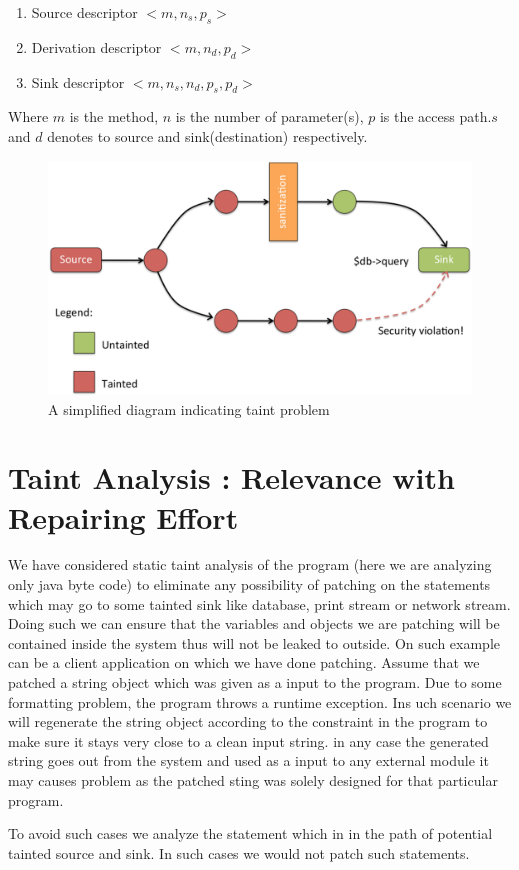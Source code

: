 \begin{enumerate}
	\item Source descriptor $<m,n_s,p_s>$
	\item Derivation descriptor $<m,n_d,p_d>$
	\item Sink descriptor $<m,n_s,n_d,p_s,p_d>$
\end{enumerate}
Where $m$ is the method, $n$ is the number of parameter(s), $p$ is the access
path.$s$ and $d$ denotes to source and sink(destination) respectively.
\begin{figure}[ht!]
\centering
\includegraphics[width=5.5in]{images/Taint.png}
\caption{A simplified diagram indicating taint problem}
\label{fig:taint}
\end{figure}

\section{Taint Analysis : Relevance with Repairing Effort}
\label{sec:TaintRepairing}

We have considered static taint analysis of the program (here we are analyzing
only java byte code) to eliminate any possibility of patching on the statements
which may go to some tainted sink like database, print stream or network stream.
Doing such we can ensure that the variables and objects we are patching will be
contained inside the system thus will not be leaked to outside. On such example
can be a client application on which we have done patching. Assume that we
patched a string object which was given as a input to the program. Due to some
formatting problem, the program throws a runtime exception. Ins uch scenario we
will regenerate the string object according to the constraint in the program to
make sure it stays very close to a clean input string. in any case the generated
string goes out from the system and used as a input to any external module it
may causes problem as the patched sting was solely designed for that particular
program. 

To avoid such cases we analyze the statement which in in the path of potential
tainted source and sink. In such cases we would not patch such statements.

